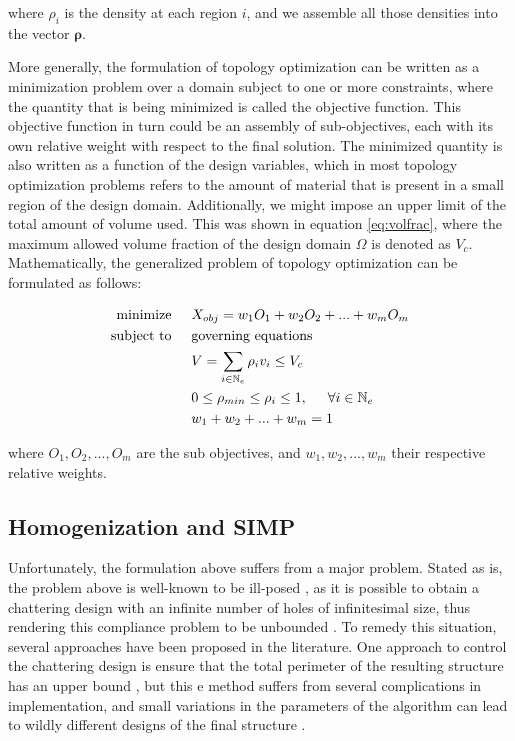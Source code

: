 \documentclass[../main.tex]{subfiles}
\begin{document}
where $\rho_i$ is the density at each region $i$, and we assemble all those densities into the vector $\bm{\rho}$. 

More generally, the formulation of topology optimization can be written as a minimization problem over a domain subject to one or more constraints, where the quantity that is being minimized is called the objective function. This objective function in turn could be an assembly of sub-objectives, each with its own relative weight with respect to the final solution. The minimized quantity is also written as a function of the design variables, which in most topology optimization problems refers to the amount of material that is present in a small region of the design domain. Additionally, we might impose an upper limit of the total amount of volume used. This was shown in equation \ref{eq:volfrac}, where the maximum allowed volume fraction of the design domain $\Omega$ is denoted as $V_c$. Mathematically, the generalized problem of topology optimization can be formulated as follows:

\begin{align}
  \text{minimize}  & \hspace{0.5cm} X_{obj} = w_1 O_1 + w_2 O_2 + ... + w_m O_m  \nonumber \\ 
  \text{subject to} & \hspace{0.5cm} \text{governing equations}  \\ 
                    & \hspace{0.5cm} V = \sum _{i \in \mathbb{N}_e} \rho_i v_i \leq V_c \nonumber \\ 
                    & \hspace{0.5cm} 0 \leq \rho_{min} \leq \rho_i \leq 1, \hspace{0.5cm} \forall i \in \mathbb{N}_e \nonumber \\
        & \hspace{0.5cm} w_1 + w_2 + ... + w_m = 1 \nonumber 
 \end{align}

 where $O_1, O_2, ... , O_m$ are the sub objectives, and $w_1, w_2, ... , w_m$ their respective relative weights.

\subsection{Homogenization and SIMP}
Unfortunately, the formulation above suffers from a major problem. Stated as is, the problem above is well-known to be ill-posed \cite{kohnOptimalDesignRelaxation1986}, as it is possible to obtain a chattering design with an infinite number of holes of infinitesimal size, thus rendering this compliance problem to be unbounded \cite{liuEfficient3DTopology2014}. To remedy this situation, several approaches have been proposed in the literature. One approach to control the chattering design is ensure that the total perimeter of the resulting structure has an upper bound \cite{haberNewApproachVariabletopology1996} \cite{jogTopologyDesignStructures2002}, but this e method suffers from several complications in implementation, and small variations in the parameters of the algorithm can lead to wildly different designs of the final structure \cite{jogTopologyDesignStructures2002}.
\end{document}
